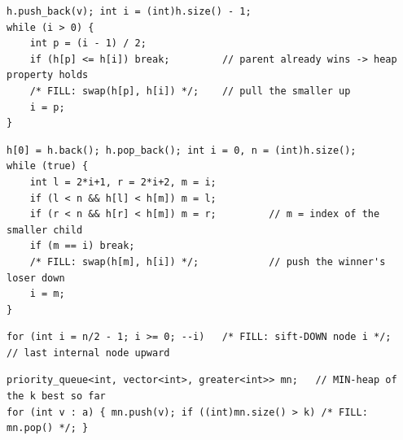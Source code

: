 \begin{lstlisting}[caption={Drill 1 -- sift-up on push (from \coderef{c07-heapops})}]
h.push_back(v); int i = (int)h.size() - 1;
while (i > 0) {
    int p = (i - 1) / 2;
    if (h[p] <= h[i]) break;         // parent already wins -> heap property holds
    /* FILL: swap(h[p], h[i]) */;    // pull the smaller up
    i = p;
}
\end{lstlisting}

\begin{lstlisting}[caption={Drill 2 -- sift-down on pop (from \coderef{c07-heapops})}]
h[0] = h.back(); h.pop_back(); int i = 0, n = (int)h.size();
while (true) {
    int l = 2*i+1, r = 2*i+2, m = i;
    if (l < n && h[l] < h[m]) m = l;
    if (r < n && h[r] < h[m]) m = r;         // m = index of the smaller child
    if (m == i) break;
    /* FILL: swap(h[m], h[i]) */;            // push the winner's loser down
    i = m;
}
\end{lstlisting}

\begin{lstlisting}[caption={Drill 3 -- Floyd build loop (from \coderef{c07-build})}]
for (int i = n/2 - 1; i >= 0; --i)   /* FILL: sift-DOWN node i */;   // last internal node upward
\end{lstlisting}

\begin{lstlisting}[caption={Drill 4 -- size-$k$ top-$k$ (from \coderef{c07-topk-soln})}]
priority_queue<int, vector<int>, greater<int>> mn;   // MIN-heap of the k best so far
for (int v : a) { mn.push(v); if ((int)mn.size() > k) /* FILL: mn.pop() */; }
\end{lstlisting}

